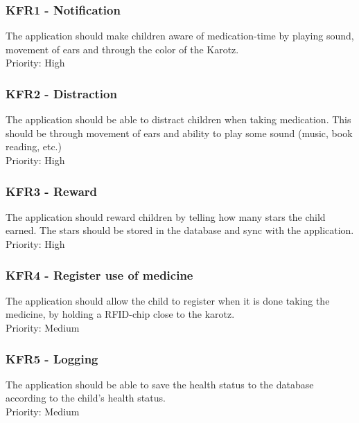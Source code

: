 \subsubsection{KFR1 - Notification}
The application should make children aware of medication-time by playing sound,
movement of ears and through the color of the Karotz. 
\\
Priority: High
\subsubsection{KFR2 - Distraction}
The application should be able to distract children when taking medication. This
should be through movement of ears and ability to play some sound (music,
book reading, etc.)
\\
Priority: High
\subsubsection{KFR3 - Reward}
The application should reward children by telling how many stars the child earned. The stars should be stored in the database and sync with the application.
\\
Priority: High
\subsubsection{KFR4 - Register use of medicine}
The application should allow the child to register when it is done taking the medicine, by
holding a RFID-chip close to the karotz.
\\
Priority: Medium

\subsubsection{KFR5 - Logging}
The application should be able to save the health status to the database
according to the child's health status.
\\ 
Priority: Medium


